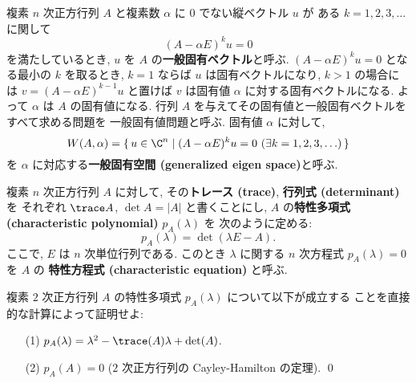 \documentclass[12pt,twoside]{jarticle}
\begin{document}
複素 $n$ 次正方行列 $A$ と複素数 $\alpha$ に $0$ でない縦ベクトル $u$ が
ある $k=1,2,3,\ldots$ に関して
\begin{equation*}
  (A - \alpha E)^k u = 0
\end{equation*}
を満たしているとき, $u$ を $A$ の{\bf 一般固有ベクトル}と呼ぶ.
$(A - \alpha E)^k u = 0$ となる最小の $k$ を取るとき,
$k=1$ ならば $u$ は固有ベクトルになり,
$k>1$ の場合には $v = (A - \alpha E)^{k-1}u$ と置けば $v$ は固有値 $\alpha$ 
に対する固有ベクトルになる.  よって $\alpha$ は $A$ の固有値になる. 
行列 $A$ を与えてその固有値と一般固有ベクトルをすべて求める問題を
一般固有値問題と呼ぶ.  固有値 $\alpha$ に対して, 
\begin{equation*}
  W(A,\alpha) 
  = \{\, u\in\C^n \mid (A - \alpha E)^k u = 0 \ (\exists k = 1,2,3,\ldots)\,\}
\end{equation*}
を $\alpha$ に対応する{\bf 一般固有空間 (generalized eigen space)}と呼ぶ.

複素 $n$ 次正方行列 $A$ に対して, 
その{\bf トレース (trace)}, {\bf 行列式 (determinant)} を
それぞれ $\trace A$, $\det A = |A|$ と書くことにし, 
$A$ の{\bf 特性多項式 (characteristic polynomial)} $p_A(\lambda)$ を
次のように定める:
\begin{equation*}
  p_A(\lambda) = \det(\lambda E - A).
\end{equation*}
ここで, $E$ は $n$ 次単位行列である. 
このとき $\lambda$ に関する $n$ 次方程式 $p_A(\lambda)=0$ を $A$ の
{\bf 特性方程式 (characteristic equation)} と呼ぶ. 


\begin{question}[簡単過ぎるので3点]
  \label{q:char-poly-2.1}
  複素 $2$ 次正方行列 $A$ の特性多項式 $p_A(\lambda)$ について以下が成立する
  ことを直接的な計算によって証明せよ: 
  \begin{enumerate}
  \item[(1)] \( p_A(\lambda) = \lambda^2 - \trace(A)\lambda + \det(A) \).
  \item[(2)] \( p_A(A) = 0 \) \quad ($2$ 次正方行列の Cayley-Hamilton の定理).
  \qed
  \end{enumerate}
\end{question}
\end{document}
